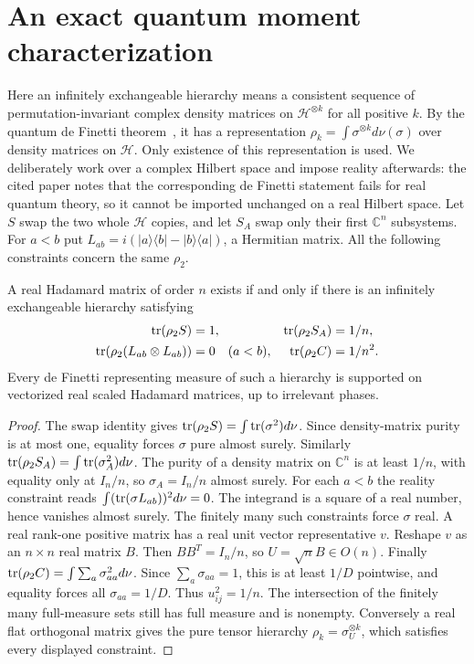 \section{An exact quantum moment characterization}
Here an infinitely exchangeable hierarchy means a consistent sequence
of permutation-invariant complex density matrices on
$\mathcal H^{\otimes k}$ for all positive $k$. By the quantum de Finetti
theorem~\cite{s08:CFS}, it has a representation
$\rho_k=\int\sigma^{\otimes k}d\nu(\sigma)$ over density matrices on
$\mathcal H$. Only existence of this representation is used.
We deliberately work over a complex Hilbert space and impose reality
afterwards: the cited paper notes that the corresponding de Finetti
statement fails for real quantum theory, so it cannot be imported
unchanged on a real Hilbert space.
Let $S$ swap the two whole $\mathcal H$ copies, and let $S_A$ swap
only their first $\mathbb C^n$ subsystems. For $a<b$ put
$L_{ab}=i(|a\rangle\langle b|-|b\rangle\langle a|)$, a Hermitian
matrix. All the following constraints concern the same $\rho_2$.
\begin{theorem}
A real Hadamard matrix of order $n$ exists if and only if there is
an infinitely exchangeable hierarchy satisfying
\begin{align*}
 \operatorname{tr}(\rho_2S)&=1,& \operatorname{tr}(\rho_2S_A)&=1/n,\\
 \operatorname{tr}(\rho_2(L_{ab}\otimes L_{ab}))&=0\quad(a<b),&
 \operatorname{tr}(\rho_2 C)&=1/n^2.
\end{align*}
Every de Finetti representing measure of such a hierarchy is supported
on vectorized real scaled Hadamard matrices, up to irrelevant phases.
\end{theorem}
\begin{proof}
The swap identity gives $\operatorname{tr}(\rho_2S)=\int\operatorname{tr}(\sigma^2)d\nu$.
Since density-matrix purity is at most one, equality forces $\sigma$
pure almost surely. Similarly
$\operatorname{tr}(\rho_2S_A)=\int\operatorname{tr}(\sigma_A^2)d\nu$. The purity of a density
matrix on $\mathbb C^n$ is at least $1/n$, with equality only at
$I_n/n$, so $\sigma_A=I_n/n$ almost surely.
For each $a<b$ the reality constraint reads
$\int(\operatorname{tr}(\sigma L_{ab}))^2d\nu=0$. The integrand is a square of a
real number, hence vanishes almost surely. The finitely many such
constraints force $\sigma$ real. A real rank-one positive matrix has
a real unit vector representative $v$. Reshape $v$ as an $n\times n$
real matrix $B$. Then $BB^T=I_n/n$, so $U=\sqrt nB\in O(n)$.
Finally $\operatorname{tr}(\rho_2 C)=\int\sum_a\sigma_{aa}^2d\nu$.
Since $\sum_a\sigma_{aa}=1$, this is at least $1/D$ pointwise,
and equality forces all $\sigma_{aa}=1/D$. Thus $u_{ij}^2=1/n$.
The intersection of the finitely many full-measure sets still has
full measure and is nonempty. Conversely a real flat orthogonal
matrix gives the pure tensor hierarchy $\rho_k=\sigma_U^{\otimes k}$,
which satisfies every displayed constraint.
\end{proof}
